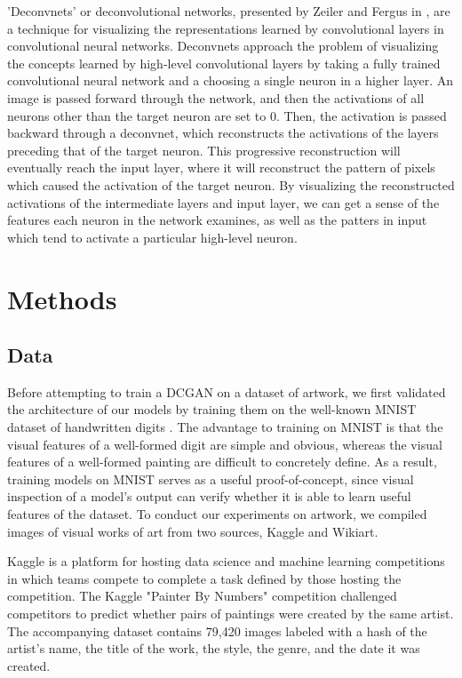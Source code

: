 \documentclass[10pt,twocolumn,letterpaper]{article}
\begin{document}
'Deconvnets' or deconvolutional networks, presented by Zeiler and Fergus in \cite{zeiler2014visualizing}, are a technique for visualizing the representations learned by convolutional layers in convolutional neural networks. Deconvnets approach the problem of visualizing the concepts learned by high-level convolutional layers by taking a fully trained convolutional neural network and a choosing a single neuron in a higher layer. An image is passed forward through the network, and then the activations of all neurons other than the target neuron are set to 0. Then, the activation is passed backward through a deconvnet, which reconstructs the activations of the layers preceding that of the target neuron. This progressive reconstruction will eventually reach the input layer, where it will reconstruct the pattern of pixels which caused the activation of the target neuron. By visualizing the reconstructed activations of the intermediate layers and input layer, we can get a sense of the features each neuron in the network examines, as well as the patters in input which tend to activate a particular high-level neuron.


\section{Methods}
\subsection{Data}
Before attempting to train a DCGAN on a dataset of artwork, we first validated the architecture of our models by training them on the well-known MNIST dataset of handwritten digits \cite{lecun2010mnist}. The advantage to training on MNIST is that the visual features of a well-formed digit are simple and obvious, whereas the visual features of a well-formed painting are difficult to concretely define. As a result, training models on MNIST serves as a useful proof-of-concept, since visual inspection of a model's output can verify whether it is able to learn useful features of the dataset. To conduct our experiments on artwork, we compiled images of visual works of art from two sources, Kaggle and Wikiart.

Kaggle is a platform for hosting data science and machine learning competitions in which teams compete to complete a task defined by those hosting the competition. The Kaggle "Painter By Numbers" competition challenged competitors to predict whether pairs of paintings were created by the same artist. The accompanying dataset contains 79,420 images labeled with a hash of the artist's name, the title of the work, the style, the genre, and the date it was created.
\end{document}
